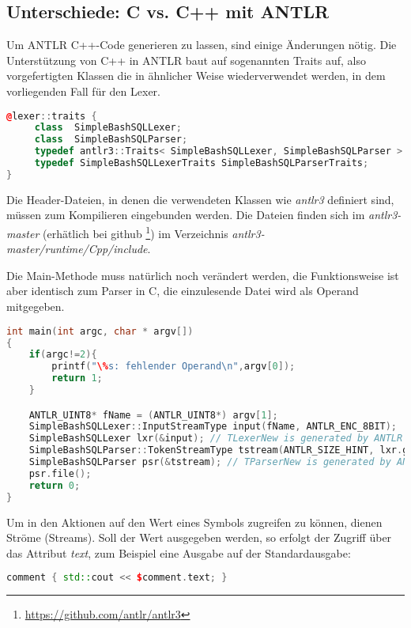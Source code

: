 \subsection{Unterschiede: C vs. C++ mit ANTLR}
Um ANTLR C++-Code generieren zu lassen, sind einige Änderungen nötig.
Die Unterstützung von C++ in ANTLR baut auf sogenannten Traits auf, also vorgefertigten Klassen die in ähnlicher Weise wiederverwendet werden, in dem vorliegenden Fall für den Lexer.

\begin{lstlisting}[language=C++]
@lexer::traits {
     class  SimpleBashSQLLexer;
     class  SimpleBashSQLParser;
     typedef antlr3::Traits< SimpleBashSQLLexer, SimpleBashSQLParser > SimpleBashSQLLexerTraits;
     typedef SimpleBashSQLLexerTraits SimpleBashSQLParserTraits;
}
\end{lstlisting}

Die Header-Dateien, in denen die verwendeten Klassen wie \textit{antlr3} definiert sind, müssen zum Kompilieren eingebunden werden. Die Dateien finden sich im \textit{antlr3-master} (erhätlich bei github
\footnote{\url{https://github.com/antlr/antlr3}})
im Verzeichnis \textit{antlr3-master/runtime/Cpp/include}.

Die Main-Methode muss natürlich noch verändert werden, die Funktionsweise ist aber identisch zum Parser in C, die einzulesende Datei wird als Operand mitgegeben.

\begin{lstlisting}[language=C++]
int main(int argc, char * argv[])
{
	if(argc!=2){
		printf("\%s: fehlender Operand\n",argv[0]);
		return 1;
	}

	ANTLR_UINT8* fName = (ANTLR_UINT8*) argv[1];
	SimpleBashSQLLexer::InputStreamType input(fName, ANTLR_ENC_8BIT);
	SimpleBashSQLLexer lxr(&input); // TLexerNew is generated by ANTLR
	SimpleBashSQLParser::TokenStreamType tstream(ANTLR_SIZE_HINT, lxr.get_tokSource() );
	SimpleBashSQLParser psr(&tstream); // TParserNew is generated by ANTLR3
	psr.file();
	return 0;
}
\end{lstlisting}

Um in den Aktionen auf den Wert eines Symbols zugreifen zu können, dienen Ströme (Streams). Soll der Wert ausgegeben werden, so erfolgt der Zugriff über das Attribut \textit{text}, zum Beispiel eine Ausgabe auf der Standardausgabe:
\begin{lstlisting}[language=C++]
comment { std::cout << $comment.text; }
\end{lstlisting}

